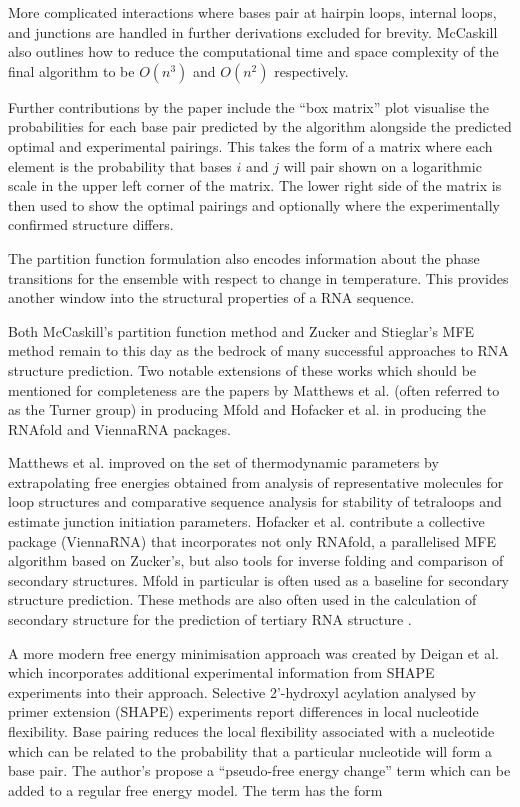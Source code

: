 \documentclass[journal]{IEEEtran}
\begin{document}
More complicated interactions where bases pair at hairpin loops, internal loops, and junctions are handled in further derivations excluded for brevity. McCaskill also outlines how to reduce the computational time and space complexity of the final algorithm to be $O(n^3)$ and $O(n^2)$ respectively.

Further contributions by the paper include the ``box matrix'' plot visualise the probabilities for each base pair predicted by the algorithm alongside the predicted optimal and experimental pairings. This takes the form of a matrix where each element is the probability that bases $i$ and $j$ will pair shown on a logarithmic scale in the upper left corner of the matrix. The lower right side of the matrix is then used to show the optimal pairings and optionally where the experimentally confirmed structure differs. 

The partition function formulation also encodes information about the phase transitions for the ensemble with respect to change in temperature. This provides another window into the structural properties of a RNA sequence.

Both McCaskill's partition function method and Zucker and Stieglar's MFE method remain to this day as the bedrock of many successful approaches to RNA structure prediction. Two notable extensions of these works which should be mentioned for completeness are the papers by Matthews et al. \cite{mathews1999expanded} (often referred to as the Turner group) in producing Mfold and Hofacker et al. \cite{hofacker1994fast} in producing the RNAfold and ViennaRNA packages. 

Matthews et al. improved on the set of thermodynamic parameters by extrapolating free energies obtained from analysis of representative molecules for loop structures and comparative sequence analysis for stability of tetraloops and estimate junction initiation parameters. Hofacker et al. contribute a collective package (ViennaRNA) that incorporates not only RNAfold, a parallelised MFE algorithm based on Zucker's, but also tools for inverse folding and comparison of secondary structures. Mfold in particular is often used as a baseline for secondary structure prediction. These methods are also often used in the calculation of secondary structure for the prediction of tertiary RNA structure \cite{laing2010computational, cruz2012rna, miao2015rna}.

A more modern free energy minimisation approach was created by Deigan et al. \cite{deigan2009accurate} which incorporates additional experimental information from SHAPE experiments into their approach. Selective 2'-hydroxyl acylation analysed by primer extension (SHAPE) experiments report differences in local nucleotide flexibility. Base pairing reduces the local flexibility associated with a nucleotide which can be related to the probability that a particular nucleotide will form a base pair. The author's propose a ``pseudo-free energy change'' term which can be added to a regular free energy model. The term has the form
\end{document}
